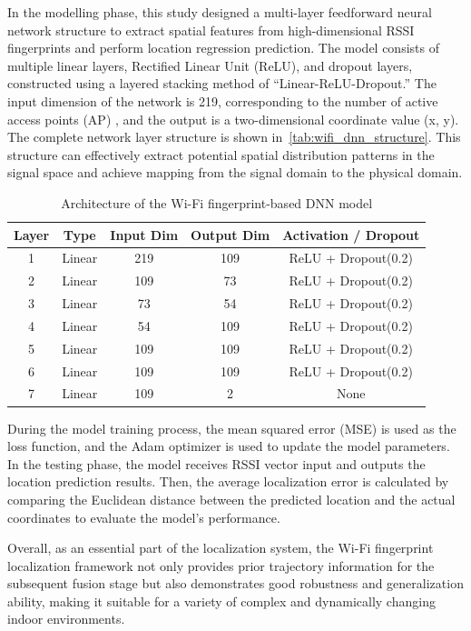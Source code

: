 \documentclass[12pt,a4paper]{article}
\numberwithin{equation}{section}
\begin{document}
In the modelling phase, this study designed a multi-layer feedforward neural
network structure to extract spatial features from high-dimensional RSSI
fingerprints and perform location regression prediction. The model consists of
multiple linear layers, Rectified Linear Unit (ReLU), and dropout layers,
constructed using a layered stacking method of “Linear-ReLU-Dropout.” The
input dimension of the network is 219, corresponding to the number of active
access points (AP) , and the output is a
two-dimensional coordinate value (x, y). The complete network layer structure is
shown in~\autoref{tab:wifi_dnn_structure}. This structure can effectively
extract potential spatial distribution patterns in the signal space and achieve
mapping from the signal domain to the physical domain.
\begin{table}[H]
  \centering
  \caption{Architecture of the Wi-Fi fingerprint-based DNN model}
  \label{tab:wifi_dnn_structure}
  \begin{tabular}{ccccc}
    \toprule
    \textbf{Layer} & \textbf{Type} & \textbf{Input Dim} & \textbf{Output Dim} & \textbf{Activation / Dropout} \\
    \midrule
    1 & Linear & 219  & 109 & ReLU + Dropout(0.2) \\
    2 & Linear & 109  & 73  & ReLU + Dropout(0.2) \\
    3 & Linear & 73   & 54  & ReLU + Dropout(0.2) \\
    4 & Linear & 54   & 109 & ReLU + Dropout(0.2) \\
    5 & Linear & 109  & 109 & ReLU + Dropout(0.2) \\
    6 & Linear & 109  & 109 & ReLU + Dropout(0.2) \\
    7 & Linear & 109  & 2   & None \\
    \bottomrule
  \end{tabular}
\end{table}

During the model training process, the mean squared error (MSE)
 is used as the loss function, and the
Adam optimizer is used to update the model parameters. In the testing phase, the
model receives RSSI vector input and outputs the location prediction
results. Then, the average localization error is calculated by comparing the
Euclidean distance between the predicted location and the actual coordinates to
evaluate the model's performance.

Overall, as an essential part of the localization system, the Wi-Fi fingerprint
localization framework not only provides prior trajectory information for the
subsequent fusion stage but also demonstrates good robustness and generalization
ability, making it suitable for a variety of complex and dynamically changing
indoor environments.
\end{document}
